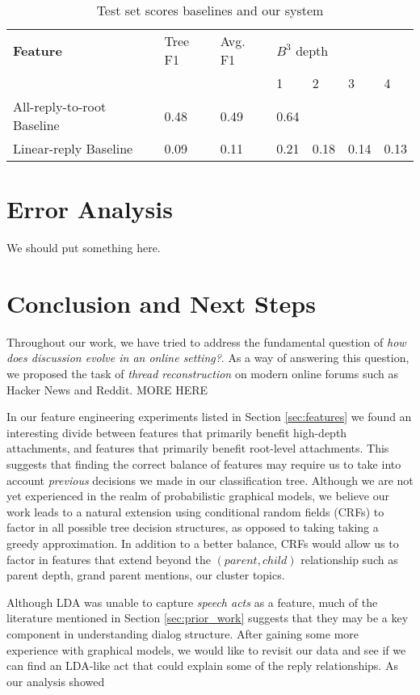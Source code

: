 \documentclass[10pt]{article}
\begin{document}
\begin{table}[h]\footnotesize
 \begin{tabular}{| l | l | l | l | l | l | l |} 
   \hline
   \textbf{Feature} & Tree F1 & Avg. F1 & \multicolumn{4}{l|}{$B^3$ depth} \\
                      & & & 1 & 2 & 3 & 4\\
   \hline
   All-reply-to-root Baseline & 0.48 & 0.49 & 0.64 & & & \\
        Linear-reply Baseline & 0.09 & 0.11 & 0.21 & 0.18 & 0.14 & 0.13 \\
   \hline
  \end{tabular}
  \caption{Test set scores baselines and our system}
  \label{table:results}
\end{table}

\section{Error Analysis}
We should put something here.

\section{Conclusion and Next Steps}
Throughout our work, we have tried to address the fundamental question of
\textit{how does discussion evolve in an online setting?}. As a way of answering
this question, we proposed the task of \textit{thread reconstruction} on modern
online forums such as Hacker News and Reddit. MORE HERE

In our feature engineering experiments listed in Section \ref{sec:features} we
found an interesting divide between features that primarily benefit high-depth
attachments, and features that primarily benefit root-level attachments. This
suggests that finding the correct balance of features may require us to take into
account \textit{previous} decisions we made in our classification tree. Although
we are not yet experienced in the realm of probabilistic graphical models, we
believe our work leads to a natural extension using conditional random fields
(CRFs) to factor in all possible tree decision structures, as opposed to taking
taking a greedy approximation. In addition to a better balance, CRFs
would allow us to factor in features that extend beyond the $(parent,child)$
relationship such as parent depth, grand parent mentions, our cluster topics. 

Although LDA was unable to capture \textit{speech acts} as a feature, much of
the literature mentioned in Section \ref{sec:prior_work} suggests that they may
be a key component in understanding dialog structure. After gaining some more
experience with graphical models, we would like to revisit our
data and see if we can find an LDA-like act that could explain some of the reply
relationships. As our analysis showed
\end{document}

